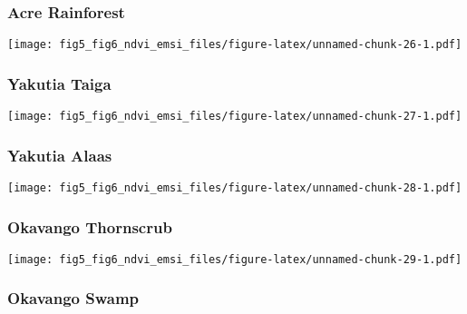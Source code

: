 \documentclass[
]{article}
\begin{document}
\hypertarget{acre-rainforest}{%
\subsubsection{Acre Rainforest}\label{acre-rainforest}}

\texttt{[image: fig5\_fig6\_ndvi\_emsi\_files/figure-latex/unnamed-chunk-26-1.pdf]}

\hypertarget{htmlwidget-adddb9d9579a3127db97}{}
\begin{plotly}

\end{plotly}

\hypertarget{yakutia-taiga}{%
\subsubsection{Yakutia Taiga}\label{yakutia-taiga}}

\texttt{[image: fig5\_fig6\_ndvi\_emsi\_files/figure-latex/unnamed-chunk-27-1.pdf]}

\hypertarget{htmlwidget-c9a5e29748559a8f7acd}{}
\begin{plotly}

\end{plotly}

\hypertarget{yakutia-alaas}{%
\subsubsection{Yakutia Alaas}\label{yakutia-alaas}}

\texttt{[image: fig5\_fig6\_ndvi\_emsi\_files/figure-latex/unnamed-chunk-28-1.pdf]}

\hypertarget{htmlwidget-93c1580a7053b86e33bb}{}
\begin{plotly}

\end{plotly}

\hypertarget{okavango-thornscrub-1}{%
\subsubsection{Okavango Thornscrub}\label{okavango-thornscrub-1}}

\texttt{[image: fig5\_fig6\_ndvi\_emsi\_files/figure-latex/unnamed-chunk-29-1.pdf]}

\hypertarget{htmlwidget-866a1e9c6c933af3d38e}{}
\begin{plotly}

\end{plotly}

\hypertarget{okavango-swamp-1}{%
\subsubsection{Okavango Swamp}\label{okavango-swamp-1}}
\end{document}
